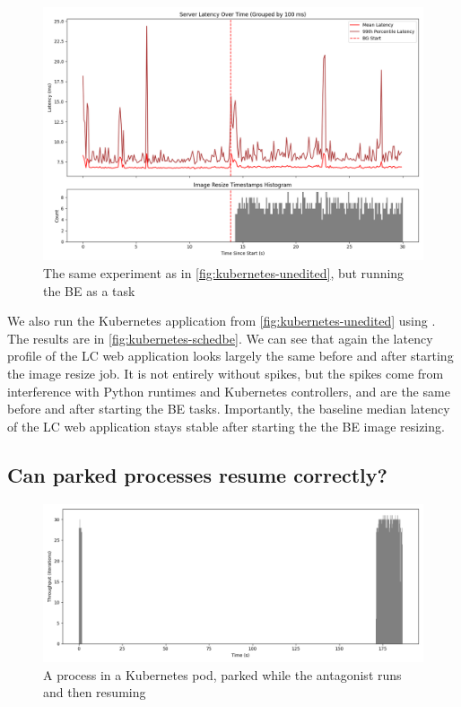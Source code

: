 \begin{figure}[t]
    \centering
    \includegraphics[width=\columnwidth]{graphs/kubernetes-schedbe.png}
    \caption{The same experiment as in \autoref{fig:kubernetes-unedited}, but
    running the BE as a \schedbe{} task}\label{fig:kubernetes-schedbe}
\end{figure}

We also run the Kubernetes application from \autoref{fig:kubernetes-unedited}
using \schedbe{}. The results are in \autoref{fig:kubernetes-schedbe}. We can
see that again the latency profile of the LC web application looks largely the
same before and after starting the image resize job. It is not entirely without
spikes, but the spikes come from interference with Python runtimes and
Kubernetes controllers, and are the same before and after starting the BE tasks.
Importantly, the baseline median latency of the LC web application stays stable
after starting the the BE image resizing. 

\subsection{Can parked processes resume correctly?}\label{ss:eval:parking}


\begin{figure}[t]
    \centering
    \includegraphics[width=\columnwidth]{graphs/parked-kubernetes.png}
    \caption{A \beclass{} process in a Kubernetes pod, parked while the
    antagonist runs and then resuming}\label{fig:parked-kubernetes}
\end{figure}

